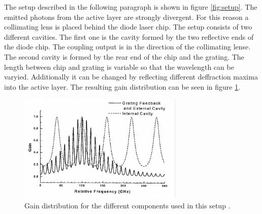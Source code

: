 The setup described in the following paragraph is shown in figure \ref{fig:setup}.
The emitted photons from the active layer are strongly divergent. For this reason
a collimating lens is placed behind the diode laser chip. The setup consists of
two different cavities. The first one is the cavity formed by the two reflective ends
of the diode chip. The coupling output is in the direction of the collimating lense.
The second cavity is formed by the rear end of the chip and the grating. The length
between chip and grating is variable so that the wavelength can be varyied. Additionally
it can be changed by reflecting different deffraction maxima into the active layer.
The resulting gain distribution can be seen in figure \ref{fig:gain}.
\begin{figure}
  \centering
  \includegraphics[width = 0.7\textwidth]{Pics/gain.pdf}
  \caption{Gain distribution for the different components used in this setup \cite{anleitung}.}
  \label{fig:gain}
\end{figure}

